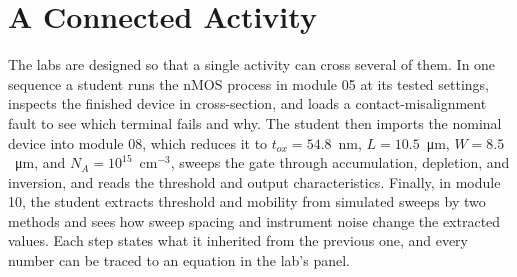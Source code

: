 \documentclass[conference]{IEEEtran}
\begin{document}
\section{A Connected Activity}
The labs are designed so that a single activity can cross several of them. In one sequence a student runs the nMOS process in module 05 at its tested settings, inspects the finished device in cross-section, and loads a contact-misalignment fault to see which terminal fails and why. The student then imports the nominal device into module 08, which reduces it to $t_{ox}=54.8$~nm, $L=10.5$~\si{\micro\metre}, $W=8.5$~\si{\micro\metre}, and $N_A=10^{15}$~cm$^{-3}$, sweeps the gate through accumulation, depletion, and inversion, and reads the threshold and output characteristics. Finally, in module 10, the student extracts threshold and mobility from simulated sweeps by two methods and sees how sweep spacing and instrument noise change the extracted values. Each step states what it inherited from the previous one, and every number can be traced to an equation in the lab's panel.

\end{document}
